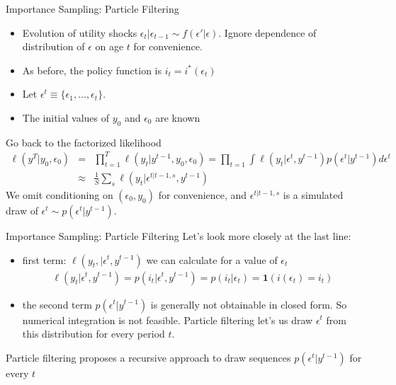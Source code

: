 \begin{frame}{Importance Sampling: Particle Filtering}
\begin{itemize}
\item Evolution of utility shocks $\epsilon_t | \epsilon_{t-1} \sim f(\epsilon' | \epsilon)$. Ignore dependence of distribution of $\epsilon$ on age $t$ for convenience.
\item As before, the policy function is $i_t = i^{*}(\epsilon_t)$
\item Let $\epsilon^t \equiv \{\epsilon_1,\ldots,\epsilon_t\}$.
\item The initial values of $y_0$ and $\epsilon_0$ are known
\end{itemize}
Go back to the factorized likelihood
\begin{eqnarray*}
\ell(y^T | y_0,\epsilon_0 ) &=& \prod_{t=1}^T \ell (y_t | y^{t-1},y_0,\epsilon_0) = \prod_{t=1} \int \ell (y_t |\epsilon^t, y^{t-1}) p(\epsilon^t | y^{t-1} )d \epsilon^t  \\
&\approx& \frac{1}{S} \sum_s \ell(y_t | \epsilon^{t | t-1,s},y^{t-1})
\end{eqnarray*}
We omit conditioning on $(\epsilon_0, y_0)$ for convenience, and $\epsilon^{t | t-1,s}$ is a simulated draw of $\epsilon^t \sim p(\epsilon^t | y^{t-1})$.
\end{frame}



\begin{frame}{Importance Sampling: Particle Filtering}
Let's look more closely at the last line:
\begin{itemize}
\item first term: $\ell(y_t, | \epsilon^t,y^{t-1})$ we can calculate for a value of $\epsilon_t$
\begin{eqnarray*}
\ell(y_t | \epsilon^t , y^{t-1}) = p(i_t | \epsilon^t, y^{t-1}) = p(i_t | \epsilon_t) = \mathbf{1}(i(\epsilon_t) = i_t)
\end{eqnarray*}
\item the second term $p(\epsilon^t | y^{t-1})$ is generally not obtainable in closed form. So numerical integration is not feasible. Particle filtering let's us draw $\epsilon^t$ from this distribution for every period $t$.
\end{itemize}
Particle filtering proposes a recursive approach to draw sequences $p(\epsilon^t | y^{t-1})$ for every $t$
\end{frame}


